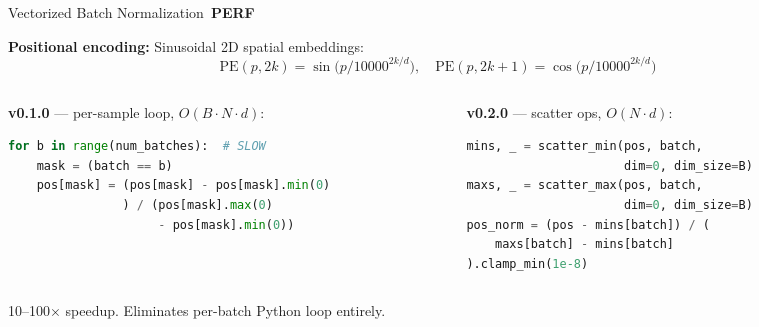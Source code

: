 \documentclass[aspectratio=169,10pt]{beamer}
\newcommand{\PERF}{\,{\scriptsize\colorbox{coralaccent}{\color{white}\textbf{PERF}}}\,}
\begin{document}
\begin{frame}[fragile]{Vectorized Batch Normalization \PERF}

\textbf{Positional encoding:} Sinusoidal 2D spatial embeddings:
\[
  \text{PE}(p, 2k) = \sin\!\big(p / 10000^{2k/d}\big), \quad
  \text{PE}(p, 2k{+}1) = \cos\!\big(p / 10000^{2k/d}\big)
\]

\vspace{0.1cm}

\begin{columns}[T]
\begin{column}{0.48\textwidth}
\textbf{v0.1.0} --- per-sample loop, $O(B \cdot N \cdot d)$:
\begin{lstlisting}[language=Python]
for b in range(num_batches):  # SLOW
    mask = (batch == b)
    pos[mask] = (pos[mask] - pos[mask].min(0)
                ) / (pos[mask].max(0)
                     - pos[mask].min(0))
\end{lstlisting}
\end{column}
\begin{column}{0.48\textwidth}
\textbf{v0.2.0} --- scatter ops, $O(N \cdot d)$:
\begin{lstlisting}[language=Python]
mins, _ = scatter_min(pos, batch,
                      dim=0, dim_size=B)
maxs, _ = scatter_max(pos, batch,
                      dim=0, dim_size=B)
pos_norm = (pos - mins[batch]) / (
    maxs[batch] - mins[batch]
).clamp_min(1e-8)
\end{lstlisting}
\end{column}
\end{columns}

\vspace{0.1cm}
{\small\alert{10--100$\times$ speedup}. Eliminates per-batch Python loop entirely.}
\end{frame}
\end{document}
